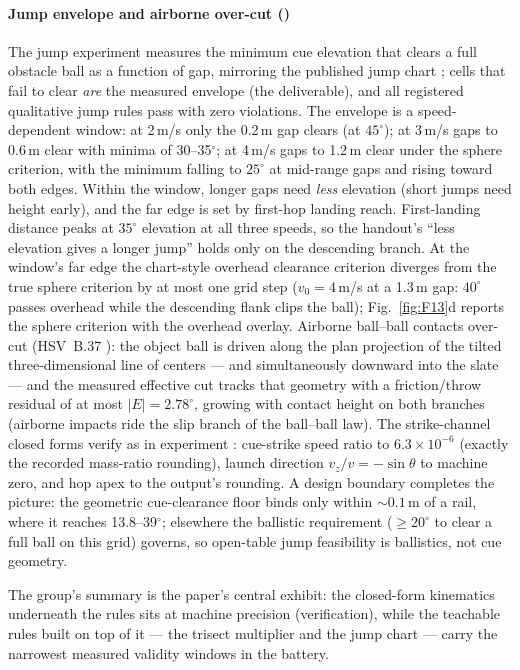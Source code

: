 \paragraph{Jump envelope and airborne over-cut ()}
The jump experiment measures the minimum cue elevation that clears a full
obstacle ball as a function of gap, mirroring the published jump chart
\citep{alciatore_faq}; cells that fail to clear \emph{are} the measured
envelope (the deliverable), and all registered qualitative jump rules
pass with zero violations. The envelope is a speed-dependent window: at
2\,m/s only the 0.2\,m gap clears (at $45^\circ$); at 3\,m/s gaps to
0.6\,m clear with minima of 30--35$^\circ$; at 4\,m/s gaps to 1.2\,m
clear under the sphere criterion, with the minimum falling to $25^\circ$
at mid-range gaps and rising toward both edges. Within the window, longer
gaps need \emph{less} elevation (short jumps need height early), and the
far edge is set by first-hop landing reach. First-landing distance peaks
at $35^\circ$ elevation at all three speeds, so the handout's ``less
elevation gives a longer jump'' holds only on the descending branch. At
the window's far edge the chart-style overhead clearance criterion
diverges from the true sphere criterion by at most one grid step
($v_0 = 4$\,m/s at a 1.3\,m gap: $40^\circ$ passes overhead while the
descending flank clips the ball); Fig.~\ref{fig:F13}d reports the
sphere criterion with the overhead overlay. Airborne ball--ball contacts
over-cut (HSV~B.37 \citep{alciatore_hsv_catalog}): the object ball is
driven along the plan projection of the tilted three-dimensional line of
centers --- and simultaneously downward into the slate --- and the
measured effective cut tracks that geometry with a friction/throw
residual of at most $|E| = 2.78^\circ$, growing with contact height on
both branches (airborne impacts ride the slip branch of the ball--ball
law). The strike-channel closed forms verify as in experiment :
cue-strike speed ratio to $6.3\times10^{-6}$ (exactly the recorded
mass-ratio rounding), launch direction $v_z/v = -\sin\theta$ to machine
zero, and hop apex to the output's rounding. A design boundary completes
the picture: the geometric cue-clearance floor binds only within
${\sim}0.1$\,m of a rail, where it reaches 13.8--39$^\circ$; elsewhere
the ballistic requirement ($\geq 20^\circ$ to clear a full ball on this
grid) governs, so open-table jump feasibility is ballistics, not cue
geometry.

The group's summary is the paper's central exhibit: the closed-form
kinematics underneath the rules sits at machine precision
(verification), while the teachable rules built on top of it --- the
trisect multiplier and the jump chart --- carry the narrowest measured
validity windows in the battery.

